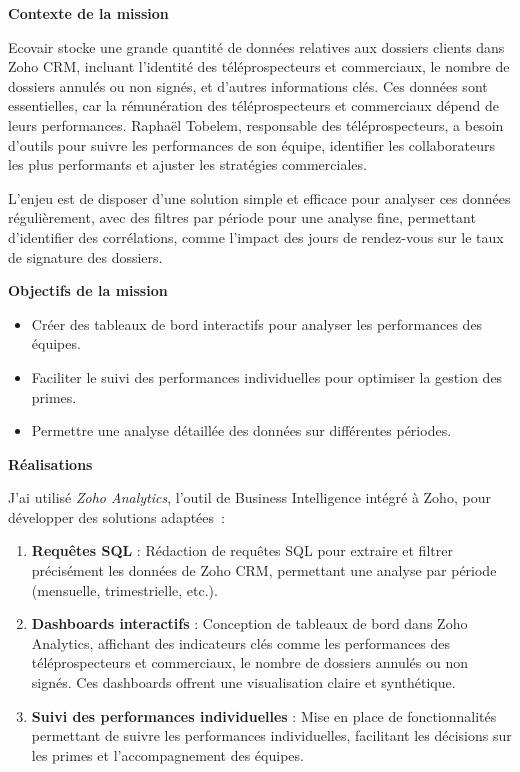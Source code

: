 \textbf{Contexte de la mission}

Ecovair stocke une grande quantité de données relatives aux dossiers clients dans Zoho CRM, incluant l’identité des téléprospecteurs et commerciaux, le nombre de dossiers annulés ou non signés, et d’autres informations clés. Ces données sont essentielles, car la rémunération des téléprospecteurs et commerciaux dépend de leurs performances. Raphaël Tobelem, responsable des téléprospecteurs, a besoin d’outils pour suivre les performances de son équipe, identifier les collaborateurs les plus performants et ajuster les stratégies commerciales.

L’enjeu est de disposer d’une solution simple et efficace pour analyser ces données régulièrement, avec des filtres par période pour une analyse fine, permettant d’identifier des corrélations, comme l’impact des jours de rendez-vous sur le taux de signature des dossiers.

\textbf{Objectifs de la mission}

\begin{itemize}
    \item Créer des tableaux de bord interactifs pour analyser les performances des équipes.
    \item Faciliter le suivi des performances individuelles pour optimiser la gestion des primes.
    \item Permettre une analyse détaillée des données sur différentes périodes.
\end{itemize}

\textbf{Réalisations}

J’ai utilisé \textit{Zoho Analytics}, l’outil de Business Intelligence intégré à Zoho, pour développer des solutions adaptées~:

\begin{enumerate}
    \item \textbf{Requêtes SQL} : Rédaction de requêtes SQL pour extraire et filtrer précisément les données de Zoho CRM, permettant une analyse par période (mensuelle, trimestrielle, etc.).
    \item \textbf{Dashboards interactifs} : Conception de tableaux de bord dans Zoho Analytics, affichant des indicateurs clés comme les performances des téléprospecteurs et commerciaux, le nombre de dossiers annulés ou non signés. Ces dashboards offrent une visualisation claire et synthétique.
    \item \textbf{Suivi des performances individuelles} : Mise en place de fonctionnalités permettant de suivre les performances individuelles, facilitant les décisions sur les primes et l’accompagnement des équipes.
\end{enumerate}

